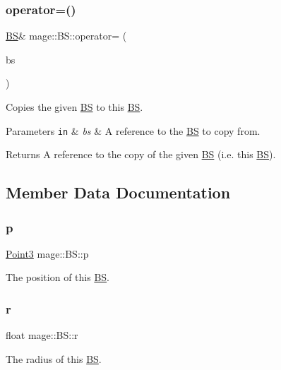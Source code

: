 \subsubsection{\texorpdfstring{operator=()}{operator=()}\hspace{0.1cm}{\footnotesize\ttfamily [2/2]}}
{\footnotesize\ttfamily \hyperlink{structmage_1_1_b_s}{BS}\& mage\+::\+B\+S\+::operator= (\begin{DoxyParamCaption}\item[{\hyperlink{structmage_1_1_b_s}{BS} \&\&}]{bs }\end{DoxyParamCaption})\hspace{0.3cm}{\ttfamily [default]}}

Copies the given \hyperlink{structmage_1_1_b_s}{BS} to this \hyperlink{structmage_1_1_b_s}{BS}.


\begin{DoxyParams}[1]{Parameters}
\mbox{\tt in}  & {\em bs} & A reference to the \hyperlink{structmage_1_1_b_s}{BS} to copy from. \\
\hline
\end{DoxyParams}
\begin{DoxyReturn}{Returns}
A reference to the copy of the given \hyperlink{structmage_1_1_b_s}{BS} (i.\+e. this \hyperlink{structmage_1_1_b_s}{BS}). 
\end{DoxyReturn}


\subsection{Member Data Documentation}
\hypertarget{structmage_1_1_b_s_a9c6ad8f37fa6b98179e8108c8584fdcf}{}\label{structmage_1_1_b_s_a9c6ad8f37fa6b98179e8108c8584fdcf} 
\subsubsection{\texorpdfstring{p}{p}}
{\footnotesize\ttfamily \hyperlink{structmage_1_1_point3}{Point3} mage\+::\+B\+S\+::p}

The position of this \hyperlink{structmage_1_1_b_s}{BS}. \hypertarget{structmage_1_1_b_s_ab2e786e8493feb28a3bc0216e8dea5bc}{}\label{structmage_1_1_b_s_ab2e786e8493feb28a3bc0216e8dea5bc} 
\subsubsection{\texorpdfstring{r}{r}}
{\footnotesize\ttfamily float mage\+::\+B\+S\+::r}

The radius of this \hyperlink{structmage_1_1_b_s}{BS}. 